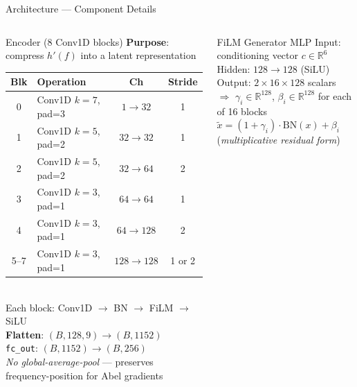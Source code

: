\documentclass[aspectratio=169,10pt]{beamer}
\begin{document}
\begin{frame}{Architecture — Component Details}
\begin{columns}

\begin{block}{Encoder (8 Conv1D blocks)}
  \scriptsize
  \textbf{Purpose}: compress $h'(f)$ into a latent representation\\[3pt]
  \begin{tabular}{@{}clcc@{}}
  \toprule
  Blk & Operation & Ch & Stride\\
  \midrule
  0 & Conv1D $k=7$, pad=3 & $1\!\to\!32$  & 1\\
  1 & Conv1D $k=5$, pad=2 & $32\!\to\!32$ & 1\\
  2 & Conv1D $k=5$, pad=2 & $32\!\to\!64$ & 2\\
  3 & Conv1D $k=3$, pad=1 & $64\!\to\!64$ & 1\\
  4 & Conv1D $k=3$, pad=1 & $64\!\to\!128$& 2\\
  5--7 & Conv1D $k=3$, pad=1 & $128\!\to\!128$& 1 or 2\\
  \bottomrule
  \end{tabular}\\[3pt]
  Each block: Conv1D $\to$ BN $\to$ FiLM $\to$ SiLU\\
  \textbf{Flatten}: $(B,128,9)\!\to\!(B,1152)$\\
  \texttt{fc\_out}: $(B,1152)\!\to\!(B,256)$\\
  \emph{No global-average-pool} — preserves\\
  frequency-position for Abel gradients
\end{block}
\vspace{3pt}
\begin{block}{FiLM Generator MLP}
  \scriptsize
  Input: conditioning vector $c\in\mathbb{R}^6$\\
  Hidden: $128\to128$ (SiLU)\\
  Output: $2\times 16\times 128$ scalars\\
  $\Rightarrow$ $\gamma_i\in\mathbb{R}^{128}$, $\beta_i\in\mathbb{R}^{128}$ for each of 16 blocks\\[2pt]
  $\tilde{x} = (1+\gamma_i)\cdot\mathrm{BN}(x) + \beta_i$\quad
  (\emph{multiplicative residual form})
\end{block}



\end{columns}
\end{frame}
\end{document}
